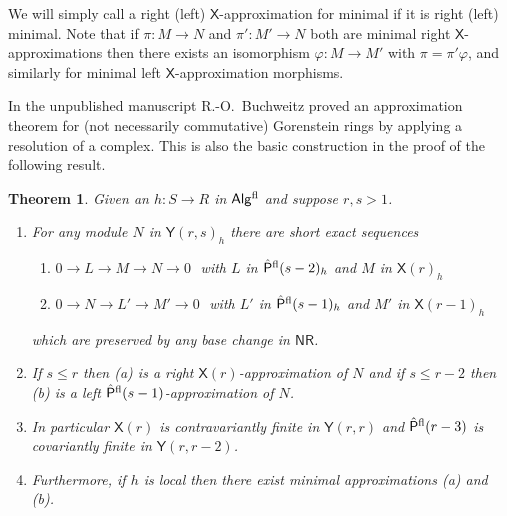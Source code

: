 \documentclass[a4paper,10pt]{amsart}
\theoremstyle{plain}
\newtheorem{thm}[xx]{Theorem}%
\theoremstyle{definition}
\theoremstyle{remark}
\numberwithin{equation}{xx}
\newcommand{\co}{\colon}
\newcommand{\ra}{\rightarrow}
\newcommand{\lra}{\longrightarrow}
\newcommand{\Algf}{\cat{Alg}{}^{\textnormal{fl}}}
\newcommand{\Pf}{\hat{\cat{P}}{}^{\textnormal{fl}}}
\renewcommand{\phi}{\varphi}
\renewcommand{\leq}{\leqslant}
\newcommand{\cat}[1]{\mathsf{{#1}}}
\begin{document}
We will simply call a right (left) \(\cat{X}\)-approximation for minimal if it is right (left) minimal. Note that if \(\pi\co M\ra N\) and \(\pi'\co  M'\ra N\) both are minimal right \(\cat{X}\)-approximations then there exists an isomorphism \(\phi\co M\ra M'\) with \(\pi=\pi'\phi\), and similarly for minimal left \(\cat{X}\)-approximation morphisms. 

In the unpublished manuscript \cite{buc:86} R.-O.\ Buchweitz proved an approximation theorem for (not necessarily commutative) Gorenstein rings by applying a resolution of a complex. This is also the basic construction in the proof of the following result.
\begin{thm}\label{thm.approx1}
Given an \(h\co S\ra R\) in \(\Algf\) and suppose \(r, s>1\)\textup{.} 
\begin{enumerate}
\item[(i)] For any module \(N\) in \(\cat{Y}(r,s)_{h}\) there are short exact sequences
\begin{enumerate}\label{eq.rapprox}
\item \(0\ra L\lra M\lra N\ra 0\) \,\,with \(L\) in \(\Pf(s-2)_{h}\) and \(M\) in \(\cat{X}(r)_{h}\)
\item \(0\ra N\lra L'\lra M'\ra 0\)  \,\,with \(L'\) in \(\Pf(s-1)_{h}\) and \(M'\) in \(\cat{X}(r-1)_{h}\)
\end{enumerate}
which are preserved by any base change in \(\cat{NR}\)\textup{.} 

\item[(ii)] If \(s\leq r\) then \textup{(a)} is a right \(\cat{X}(r)\)-approximation of \(N\) and if \(s\leq r-2\) then \textup{(b)} is a left \(\Pf(s-1)\)-approximation of \(N\)\textup{.} 

\item[(iii)] In particular \(\cat{X}(r)\) is contravariantly finite in \(\cat{Y}(r,r)\) and \(\Pf(r-3)\) is covariantly finite in \(\cat{Y}(r,r-2)\)\textup{.}

\item[(iv)] Furthermore\textup{,} if \(h\) is local then there exist minimal approximations \textup{(a)} and \textup{(b).}
\end{enumerate}
\end{thm}
\end{document}
